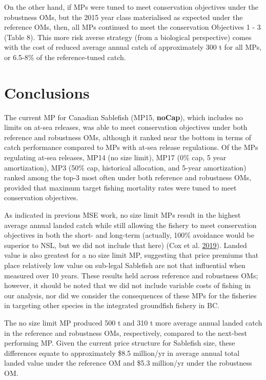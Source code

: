 \documentclass[11pt]{book}
\begin{document}
On the other hand, if MPs were tuned to meet conservation objectives under the robustness OMs, but the 2015 year class materialised as expected under the reference OMs, then, all MPs continued to meet the conservation Objectives 1 - 3 (Table 8). This more risk averse strategy (from a biological perspective) comes with the cost of reduced average annual catch of approximately 300 t for all MPs, or 6.5-8\% of the reference-tuned catch.

\hypertarget{conclusions}{%
\section{Conclusions}\label{conclusions}}

The current MP for Canadian Sablefish (MP15, \textbf{noCap}), which includes no limits on at-sea releases, was able to meet conservation objectives under both reference and robustness OMs, although it ranked near the bottom in terms of catch performance compared to MPs with at-sea release regulations. Of the MPs regulating at-sea releases, MP14 (no size limit), MP17 (0\% cap, 5 year amortization), MP3 (50\% cap, historical allocation, and 5-year amortization) ranked among the top-3 most often under both reference and robustness OMs, provided that maximum target fishing mortality rates were tuned to meet conservation objectives.

As indicated in previous MSE work, no size limit MPs result in the highest average annual landed catch while still allowing the fishery to meet conservation objectives in both the short- and long-term (actually, 100\% avoidance would be superior to NSL, but we did not include that here) (Cox et al. \protect\hyperlink{ref-cox2019evaluating}{2019}). Landed value is also greatest for a no size limit MP, suggesting that price premiums that place relatively low value on sub-legal Sablefish are not that influential when measured over 10 years. These results held across reference and robustness OMs; however, it should be noted that we did not include variable costs of fishing in our analysis, nor did we consider the consequences of these MPs for the fisheries in targeting other species in the integrated groundfish fishery in BC.

The no size limit MP produced 500 t and 310 t more average annual landed catch in the reference and robustness OMs, respectively, compared to the next-best performing MP. Given the current price structure for Sablefish size, these differences equate to approximately \$8.5 million/yr in average annual total landed value under the reference OM and \$5.3 million/yr under the robustness OM.
\end{document}
